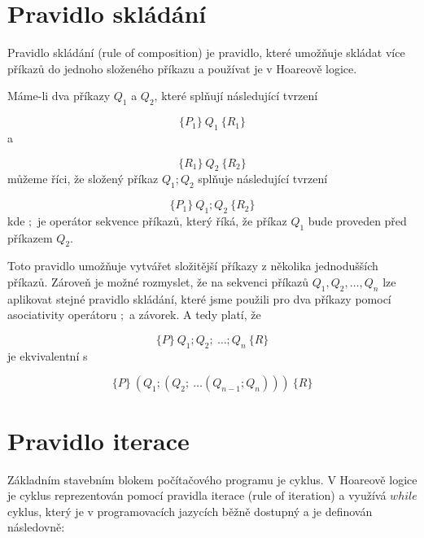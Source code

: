 \section{Pravidlo skládání}
\label{sec:hoare-pravidlo-skladani}

Pravidlo skládání (rule of composition) je pravidlo, které umožňuje
skládat více příkazů do jednoho složeného příkazu a používat je v Hoareově logice.

Máme-li dva příkazy $Q_1$ a $Q_2$, které splňují následující tvrzení

\begin{equation*}
    \{ P_1 \} \  Q_1 \  \{ R_1 \}
\end{equation*}
a

\begin{equation*}
    \{ R_1 \} \  Q_2 \  \{ R_2 \}
\end{equation*}
můžeme říci, že složený příkaz $Q_1; Q_2$ splňuje následující tvrzení

\begin{equation*}
    \{ P_1 \} \  Q_1; Q_2 \  \{ R_2 \}
\end{equation*}
kde $;$ je operátor sekvence příkazů, který říká, že příkaz $Q_1$ bude proveden před příkazem $Q_2$.

Toto pravidlo umožňuje vytvářet složitější příkazy z několika jednodušších příkazů.
Zároveň je možné rozmyslet, že na sekvenci příkazů $Q_1, Q_2, \ldots, Q_n$
lze aplikovat stejné pravidlo skládání, které jsme použili pro dva příkazy
pomocí asociativity operátoru $;$ a závorek. A tedy platí, že

\begin{equation*}
    \{ P \} \  Q_1; Q_2; \  \ldots ; Q_n \  \{ R \}
\end{equation*}
je ekvivalentní s

\begin{equation*}
    \{ P \} \  (Q_1; (Q_2; \  \ldots (Q_{n-1}; Q_n))) \  \{ R \}
\end{equation*}

\section{Pravidlo iterace}
\label{sec:hoare-pravidlo-iterace}

Základním stavebním blokem počítačového programu je cyklus.
V Hoareově logice je cyklus reprezentován pomocí pravidla iterace (rule of iteration)
a využívá $while$ cyklus, který je v programovacích jazycích běžně dostupný a je definován následovně:

